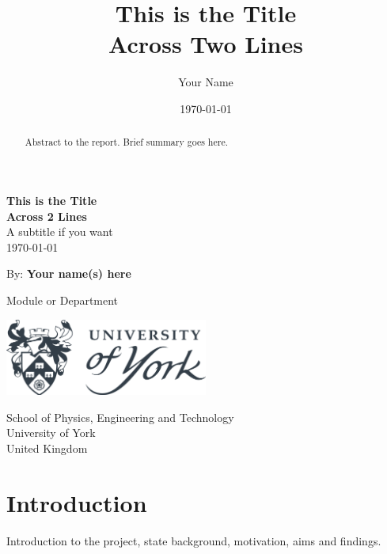 \documentclass[11pt, A4]{article}
\title{This is the Title\\Across Two Lines}
\author{Your Name}
\date{\today}
\begin{document}
\begin{titlepage}
    \begin{center}
       \vspace*{1cm}
       \LARGE
       \textbf{This is the Title\\Across 2 Lines}\\
       \vspace{0.5cm}
       \large A subtitle if you want\\
       \vspace{0.5cm}
       \today
       \vspace{1cm}
       \normalsize
       
       By: \textbf{Your name(s) here}

       \vfill
            
       Module or Department\\
       \vspace{0.5cm}
       
       \includegraphics[width=0.5\textwidth]{images/UoY_Logo.png}
       \vspace{0.5cm}
       
       School of Physics, Engineering and Technology\\
       University of York\\
       United Kingdom\\
            
    \end{center}
    \small
   \thispagestyle{empty}
\end{titlepage}

\begin{abstract}
Abstract to the report. Brief summary goes here.
    
\end{abstract}

\newpage
\tableofcontents

\printglossaries

\newpage
\section{Introduction}
Introduction to the project, state background, motivation, aims and findings.
\end{document}

